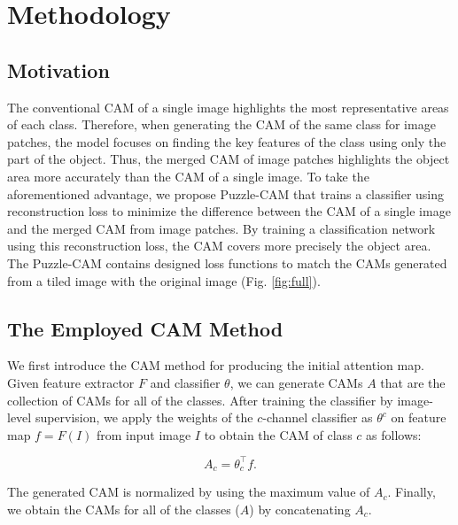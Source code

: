 \documentclass{article}
\begin{document}
\section{Methodology}
\label{sec:methodology}



\subsection{Motivation}
\label{ssec:motivation}





The conventional CAM of a single image highlights the most representative areas of each class. 
Therefore, when generating the CAM of the same class for image patches, the model focuses on finding the key features of the class using only the part of the object.
Thus, the merged CAM of image patches highlights the object area more accurately than the CAM of a single image. 
To take the aforementioned advantage, we propose Puzzle-CAM that trains a classifier using reconstruction loss to minimize the difference between the CAM of a single image and the merged CAM from image patches. 
By training a classification network using this reconstruction loss, the CAM covers more precisely the object area.
The Puzzle-CAM contains designed loss functions to match the CAMs generated from a tiled image with the original image (Fig. \ref{fig:full}).


\subsection{The Employed CAM Method}
\label{ssec:cam}
We first introduce the CAM method for producing the initial attention map.
Given feature extractor $F$ and classifier $\theta$, we can generate CAMs $A$ that are the collection of CAMs for all of the classes.
After training the classifier by image-level supervision, we apply the weights of the $c$-channel classifier as $\theta^{c}$ on feature map $f = F(I)$ from input image $I$ to obtain the CAM of class $c$ as follows: 

\begin{equation} \label{eq1}
A_c = \theta_{c}^{\top}f.
\end{equation}

The generated CAM is normalized by using the maximum value of $A_c$.
Finally, we obtain the CAMs for all of the classes ($A$) by concatenating $A_c$. 
\end{document}
